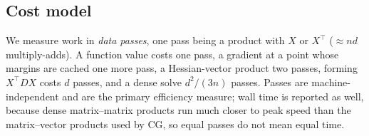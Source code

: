 \subsection{Cost model}
We measure work in \emph{data passes}, one pass being a product with $X$ or
$X^\top$ ($\approx nd$ multiply-adds). A function value costs one pass, a gradient
at a point whose margins are cached one more pass, a Hessian-vector product two
passes, forming $X^\top DX$ costs $d$ passes, and a dense solve $d^2/(3n)$ passes.
Passes are machine-independent and are the primary efficiency measure; wall time is
reported as well, because dense matrix--matrix products run much closer to peak
speed than the matrix--vector products used by CG, so equal passes do not mean
equal time.
